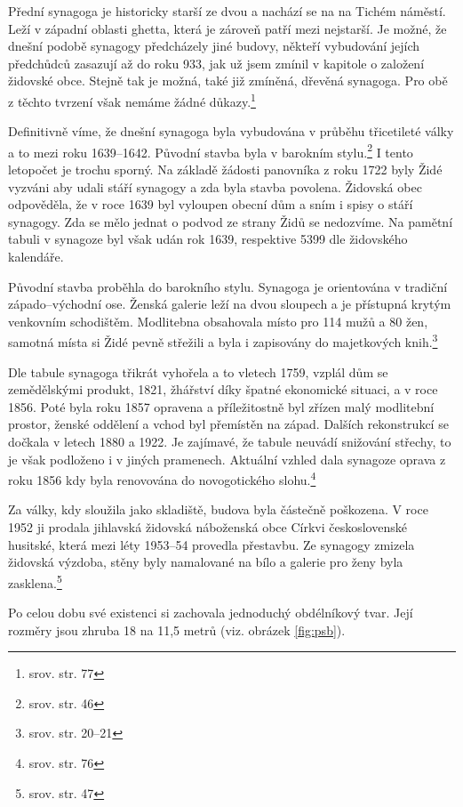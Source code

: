 \documentclass[a4paper,oneside,12pt]{report}
\begin{document}
Přední synagoga je historicky starší ze dvou a nachází se na na Tichém náměstí.
Leží v západní oblasti ghetta, která je zároveň patří mezi nejstarší.
Je možné, že dnešní podobě synagogy předcházely jiné budovy, někteří vybudování jejích předchůdců zasazují až do roku 933, jak už jsem zmínil v kapitole o založení židovské obce.
Stejně tak je možná, také již zmíněná, dřevěná synagoga.
Pro obě z těchto tvrzení však nemáme žádné důkazy.\footnote{srov. \cite{Fiser2005} str. 77}

Definitivně víme, že dnešní synagoga byla vybudována v průběhu třicetileté války a to mezi roku 1639--1642.
Původní stavba byla v barokním stylu.\footnote{srov. \cite{Klenovsky2003} str. 46}
I tento letopočet je trochu sporný.
Na základě žádosti panovníka z roku 1722 byly Židé vyzváni aby udali stáří synagogy a zda byla stavba povolena.
Židovská obec odpověděla, že v roce 1639 byl vyloupen obecní dům a sním i spisy o stáří synagogy.
Zda se mělo jednat o podvod ze strany Židů se nedozvíme.
Na pamětní tabuli v synagoze byl však udán rok 1639, respektive 5399 dle židovského kalendáře.

Původní stavba proběhla do barokního stylu.
Synagoga je orientována v tradiční západo--východní ose.
Ženská galerie leží na dvou sloupech a je přístupná krytým venkovním schodištěm.
Modlitebna obsahovala místo pro 114 mužů a 80 žen, samotná místa si Židé pevně střežili a byla i zapisovány do majetkových knih.\footnote{srov. \cite{Hanackova2008} str. 20--21}

Dle tabule synagoga třikrát vyhořela a to vletech 1759, vzplál dům se zemědělskými produkt, 1821, žhářství díky špatné ekonomické situaci, a v roce 1856.
Poté byla roku 1857 opravena a příležitostně byl zřízen malý modlitební prostor, ženské oddělení a vchod byl přemístěn na západ.
Dalších rekonstrukcí se dočkala v letech 1880 a 1922.
Je zajímavé, že tabule neuvádí snižování střechy, to je však podloženo i v jiných pramenech.
Aktuální vzhled dala synagoze oprava z roku 1856 kdy byla renovována do novogotického slohu.\footnote{srov. \cite{Fiser2005} str. 76}

Za války, kdy sloužila jako skladiště, budova byla částečně poškozena.
V roce 1952 ji prodala jihlavská židovská náboženská obce Církvi československé husitské, která mezi léty 1953--54 provedla přestavbu.
Ze synagogy zmizela židovská výzdoba, stěny byly namalované na bílo a galerie pro ženy byla zasklena.\footnote{srov. \cite{Klenovsky2003} str. 47}

Po celou dobu své existenci si zachovala jednoduchý obdélníkový tvar.
Její rozměry jsou zhruba 18 na 11,5 metrů (viz. obrázek \ref{fig:psb}).
\end{document}
